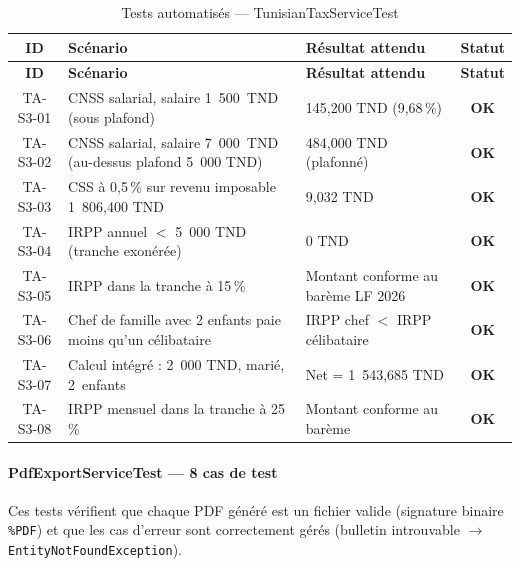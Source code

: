 \renewcommand{\arraystretch}{1.2}
\begin{small}
\begin{xltabular}{\textwidth}{|c|X|p{4cm}|c|}
\hline
{}
\textbf{ID} & \textbf{Scénario} & \textbf{Résultat attendu} & \textbf{Statut} \\ \hline
\endfirsthead \hline
{}
\textbf{ID} & \textbf{Scénario} & \textbf{Résultat attendu} & \textbf{Statut} \\ \hline
\endhead \hline \endfoot \hline
\caption{Tests automatisés --- TunisianTaxServiceTest}\label{tab:auto-tax}\endlastfoot
TA-S3-01 & CNSS salarial, salaire 1~500~TND (sous plafond)
    & 145,200 TND (9,68\,\%) & \textcolor{green!60!black}{\textbf{OK}} \\ \hline
TA-S3-02 & CNSS salarial, salaire 7~000~TND (au-dessus plafond 5~000 TND)
    & 484,000 TND (plafonné) & \textcolor{green!60!black}{\textbf{OK}} \\ \hline
TA-S3-03 & CSS à 0,5\,\% sur revenu imposable 1~806,400 TND
    & 9,032 TND & \textcolor{green!60!black}{\textbf{OK}} \\ \hline
TA-S3-04 & IRPP annuel $<$ 5~000 TND (tranche exonérée)
    & 0 TND & \textcolor{green!60!black}{\textbf{OK}} \\ \hline
TA-S3-05 & IRPP dans la tranche à 15\,\%
    & Montant conforme au barème LF 2026 & \textcolor{green!60!black}{\textbf{OK}} \\ \hline
TA-S3-06 & Chef de famille avec 2 enfants paie moins qu'un célibataire
    & IRPP chef $<$ IRPP célibataire & \textcolor{green!60!black}{\textbf{OK}} \\ \hline
TA-S3-07 & Calcul intégré : 2~000 TND, marié, 2~enfants
    & Net = 1~543,685 TND & \textcolor{green!60!black}{\textbf{OK}} \\ \hline
TA-S3-08 & IRPP mensuel dans la tranche à 25\,\%
    & Montant conforme au barème & \textcolor{green!60!black}{\textbf{OK}} \\ \hline
\end{xltabular}
\end{small}
\renewcommand{\arraystretch}{1.0}

\paragraph{PdfExportServiceTest --- 8 cas de test}
Ces tests vérifient que chaque PDF généré est un fichier valide
(signature binaire \texttt{\%PDF}) et que les cas d'erreur sont
correctement gérés (bulletin introuvable $\rightarrow$
\texttt{EntityNotFoundException}).

